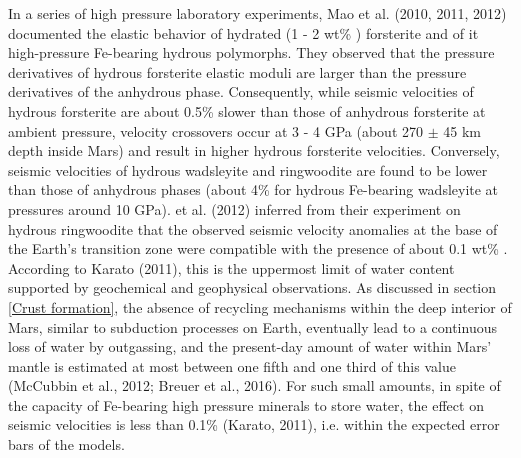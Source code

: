 In a series of high pressure laboratory experiments, Mao et al. (2010, 2011, 2012) documented the elastic behavior of hydrated (1 - 2 wt\% ) forsterite and of it high-pressure Fe-bearing hydrous polymorphs. They observed that the pressure derivatives of hydrous forsterite elastic moduli are larger than the pressure derivatives of the anhydrous phase. Consequently, while seismic velocities of hydrous forsterite are about 0.5\% slower than those of anhydrous forsterite at ambient pressure, velocity crossovers occur at 3 - 4 GPa (about 270 $\pm$ 45 km depth inside Mars) and result in higher hydrous forsterite velocities. Conversely, seismic velocities of hydrous wadsleyite and ringwoodite are found to be lower than those of anhydrous phases (about 4\% for hydrous Fe-bearing wadsleyite at pressures around 10 GPa). \citePMao et al. (2012) inferred from their experiment on hydrous ringwoodite that the observed seismic velocity anomalies at the base of the Earth's transition zone were compatible with the presence of about 0.1 wt\% . According to \cite{Karato2011} Karato (2011), this is the uppermost limit of water content supported by geochemical and geophysical observations. As discussed in section\,\ref{Crust formation}, the absence of recycling mechanisms within the deep interior of Mars, similar to subduction processes on Earth, eventually lead to a continuous loss of water by outgassing, and the present-day amount of water within Mars' mantle is estimated at most between one fifth and one third of this value (McCubbin et al., 2012; Breuer et al., 2016). For such small amounts, in spite of the capacity of Fe-bearing high pressure minerals to store water, the effect on seismic velocities is less than 0.1\% (Karato, 2011), i.e. within the expected error bars of the models.

